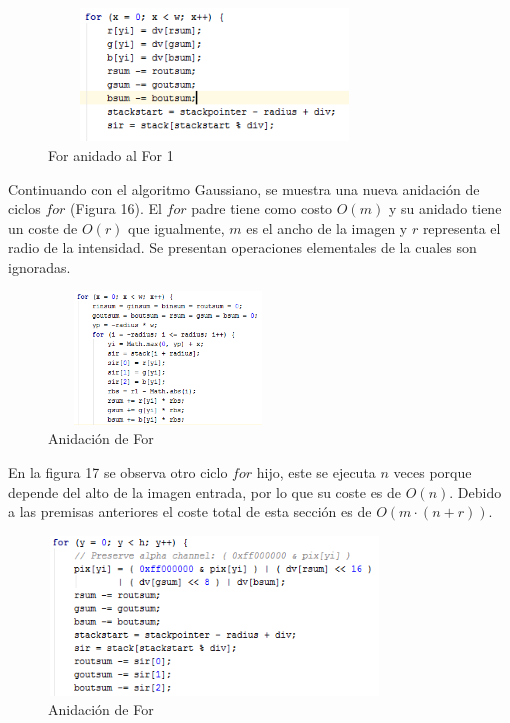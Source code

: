 \documentclass[journal]{IEEEtran}
\begin{document}
\begin{itemize}
		\begin{figure}[h]
			\centering
			\includegraphics[height= 100pt, width=250pt]{4.png}
			\caption{For anidado al For 1}
		\end{figure}
		
		\newpage
		Continuando con el algoritmo Gaussiano, se muestra una nueva anidación de ciclos $for$ (Figura 16). El $for$ padre tiene como costo $O(m)$ y su anidado tiene un coste de $O(r)$ que igualmente, $m$ es el ancho de la imagen y $r$ representa el radio de la intensidad. Se presentan operaciones elementales de la cuales son ignoradas.
		
		\begin{figure}[h]
			\centering
			\includegraphics[height= 100pt, width=180pt]{5.png}
			\caption{Anidación de For}
		\end{figure}
	
		En la figura 17 se observa otro ciclo $for$ hijo, este se ejecuta $n$ veces porque depende del alto de la imagen entrada, por lo que su coste es de $O(n)$. Debido a las premisas anteriores el coste total de esta sección es de $O(m \cdot (n + r))$.
	
		\begin{figure}[h]
			\centering
			\includegraphics[height= 120pt, width=250pt]{6.png}
			\caption{Anidación de For}
		\end{figure}
	

\end{itemize}
\end{document}
